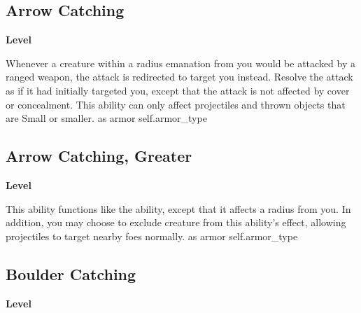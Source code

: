 \begin{multicols}{2}
\lowercase{\hypertarget{item:Arrow Catching}{}}\label{item:Arrow Catching}
\hypertarget{item:Arrow Catching}{\subsection{Arrow Catching}}
\columnbreak%
\begin{flushright}
\large\textbf{ Level}
\end{flushright}
\end{multicols}
\vspace{-1.5em}  %
Whenever a creature within a \areamed radius emanation from you would be attacked by a ranged weapon, the attack is redirected to target you instead.
Resolve the attack as if it had initially targeted you, except that the attack is not affected by cover or concealment.
This ability can only affect projectiles and thrown objects that are Small or smaller.
 
 as armor
 {self.armor_type}
\begin{multicols}{2}
\lowercase{\hypertarget{item:Arrow Catching, Greater}{}}\label{item:Arrow Catching, Greater}
\hypertarget{item:Arrow Catching, Greater}{\subsection{Arrow Catching, Greater}}
\columnbreak%
\begin{flushright}
\large\textbf{ Level}
\end{flushright}
\end{multicols}
\vspace{-1.5em}  %
This ability functions like the  ability, except that it affects a \arealarge radius from you.
In addition, you may choose to exclude creature from this ability's effect, allowing projectiles to target nearby foes normally.
 
 as armor
 {self.armor_type}
\begin{multicols}{2}
\lowercase{\hypertarget{item:Boulder Catching}{}}\label{item:Boulder Catching}
\hypertarget{item:Boulder Catching}{\subsection{Boulder Catching}}
\columnbreak%
\begin{flushright}
\large\textbf{ Level}
\end{flushright}
\end{multicols}
